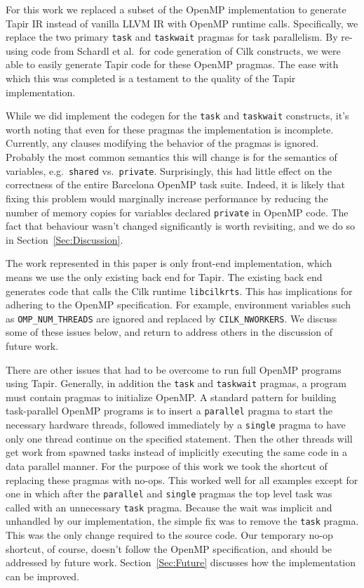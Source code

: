 \documentclass[sigconf]{acmart}
\begin{document}
For this work we replaced a subset of the OpenMP implementation to generate
Tapir IR instead of vanilla LLVM IR with OpenMP runtime calls. Specifically, we
replace the two primary \texttt{task} and \texttt{taskwait} pragmas for task
parallelism. By re-using code from Schardl et al.\ for code generation of Cilk
constructs, we were able to easily generate Tapir code for these OpenMP
pragmas. The ease with which this was completed is a testament to the quality
of the Tapir implementation.

While we did implement the codegen for the \texttt{task} and
\texttt{taskwait} constructs, it's worth noting that even for these pragmas
the implementation is incomplete. Currently, any clauses modifying the behavior
of the pragmas is ignored. Probably the most common semantics this will change
is for the semantics of variables, e.g.\ \texttt{shared} vs.\ \texttt{private}.
Surprisingly, this had little effect on the correctness of the entire Barcelona
OpenMP task suite. Indeed, it is likely that fixing this problem would
marginally increase performance by reducing the number of memory copies for
variables declared \texttt{private} in OpenMP code.  The fact that behaviour
wasn't changed significantly is worth revisiting, and we do so in
Section~\ref{Sec:Discussion}.

The work represented in this paper is only front-end implementation, which
means we use the only existing back end for Tapir. The existing back end
generates code that calls the Cilk runtime \texttt{libcilkrts}. This has
implications for adhering to the OpenMP specification. For example, environment
variables such as \texttt{OMP\_NUM\_THREADS} are ignored and replaced by
\texttt{CILK\_NWORKERS}.  We discuss some of these issues below, and return to
address others in the discussion of future work.

There are other issues that had to be overcome to run full OpenMP programs
using Tapir. Generally, in addition the \texttt{task} and \texttt{taskwait}
pragmas, a program must contain pragmas to initialize OpenMP.  A standard
pattern for building task-parallel OpenMP programs is to insert a
\texttt{parallel} pragma to start the necessary hardware threads, followed
immediately by a \texttt{single} pragma to have only one thread continue on the
specified statement. Then the other threads will get work from spawned tasks
instead of implicitly executing the same code in a data parallel manner. For
the purpose of this work we took the shortcut of replacing these pragmas with
no-ops. This worked well for all examples except for one in which after the
\texttt{parallel} and \texttt{single} pragmas the top level task was called
with an unnecessary \texttt{task} pragma.  Because the wait was implicit and
unhandled by our implementation, the simple fix was to remove the \texttt{task}
pragma. This was the only change required to the source code. Our temporary
no-op shortcut, of course, doesn't follow the OpenMP specification, and should
be addressed by future work. Section~\ref{Sec:Future} discusses how the
implementation can be improved.
\end{document}
